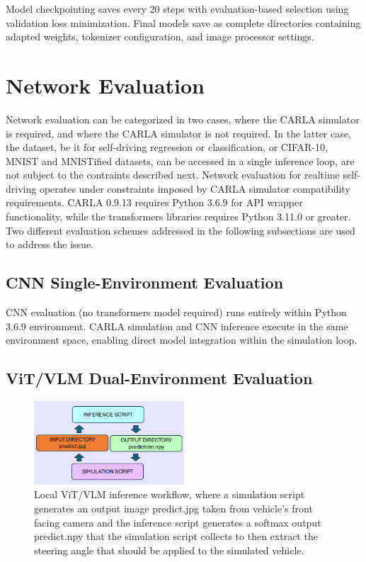 Model checkpointing saves every 20 steps with evaluation-based selection using validation loss minimization. Final models save as complete directories containing adapted weights, tokenizer configuration, and image processor settings.

\section{Network Evaluation}

Network evaluation can be categorized in two cases, where the CARLA simulator is required, and where the CARLA simulator is not required. In the latter case, the dataset, be it for self-driving regression or classification, or CIFAR-10, MNIST and MNISTified datasets, can be accessed in a single inference loop, are not subject to the contraints described next.
Network evaluation for realtime self-driving operates under constraints imposed by CARLA simulator compatibility requirements. CARLA 0.9.13 requires Python 3.6.9 for API wrapper functionality, while the transformers libraries requires Python 3.11.0 or greater. Two different evaluation schemes addressed in the following subsections are used to address the issue.

\subsection{CNN Single-Environment Evaluation}

CNN evaluation (no transformers model required) runs entirely within Python 3.6.9 environment. CARLA simulation and CNN inference execute in the same environment space, enabling direct model integration within the simulation loop.

\subsection{ViT/VLM Dual-Environment Evaluation}
\begin{figure}[h]
\centering
\includegraphics[width=0.50\textwidth]{Figures/Methods/LocalVLMInference.png}
\caption{Local ViT/VLM inference workflow, where a simulation script generates an output image predict.jpg taken from vehicle's front facing camera and the inference script generates a softmax output predict.npy that the simulation script collects to then extract the steering angle that should be applied to the simulated vehicle.}
\label{fig:LocalVLMInference}
\end{figure}

